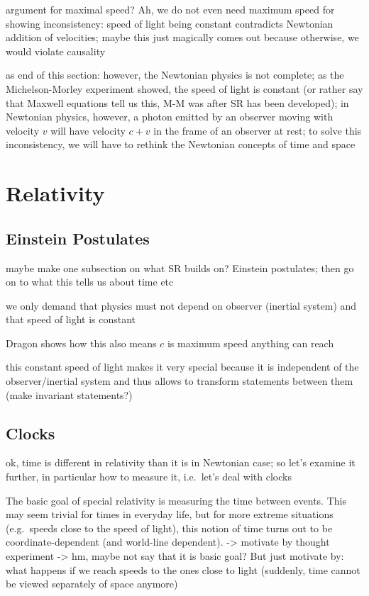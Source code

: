 argument for maximal speed? Ah, we do not even need maximum speed for showing inconsistency: speed of light being constant contradicts Newtonian addition of velocities; maybe this just magically comes out because otherwise, we would violate causality



as end of this section: however, the Newtonian physics is not complete; as the Michelson-Morley experiment showed, the speed of light is constant (or rather say that Maxwell equations tell us this, M-M was after SR has been developed); in Newtonian physics, however, a photon emitted by an observer moving with velocity $v$ will have velocity $c + v$ in the frame of an observer at rest; to solve this inconsistency, we will have to rethink the Newtonian concepts of time and space



\newpage



	\section{Relativity}
		\subsection{Einstein Postulates}

maybe make one subsection on what SR builds on? Einstein postulates; then go on to what this tells us about time etc

we only demand that physics must not depend on observer (inertial system) and that speed of light is constant


Dragon shows how this also means $c$ is maximum speed anything can reach


this constant speed of light makes it very special because it is independent of the observer/inertial system and thus allows to transform statements between them (make invariant statements?)



		\subsection{Clocks}
ok, time is different in relativity than it is in Newtonian case; so let's examine it further, in particular how to measure it, i.e.~let's deal with clocks


The basic goal of special relativity is measuring the time between events. This may seem trivial for times in everyday life, but for more extreme situations (e.g.~speeds close to the speed of light), this notion of time turns out to be coordinate-dependent (and world-line dependent). -> motivate by thought experiment
-> hm, maybe not say that it is basic goal? But just motivate by: what happens if we reach speeds to the ones close to light (suddenly, time cannot be viewed separately of space anymore)


